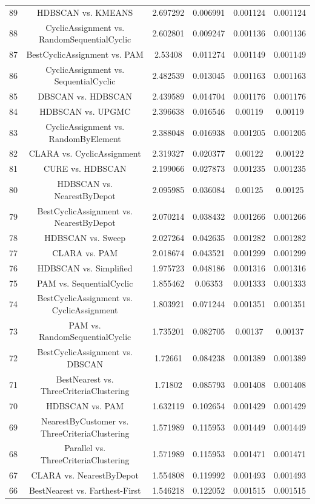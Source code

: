 \documentclass[a4paper,10pt]{article}
\begin{document}
\begin{landscape}
\begin{table}[!htp]
\begin{tabular}{cccccc}
89&HDBSCAN vs. KMEANS&2.697292&0.006991&0.001124&0.001124\\
88&CyclicAssignment vs. RandomSequentialCyclic&2.602801&0.009247&0.001136&0.001136\\
87&BestCyclicAssignment vs. PAM&2.53408&0.011274&0.001149&0.001149\\
86&CyclicAssignment vs. SequentialCyclic&2.482539&0.013045&0.001163&0.001163\\
85&DBSCAN vs. HDBSCAN&2.439589&0.014704&0.001176&0.001176\\
84&HDBSCAN vs. UPGMC&2.396638&0.016546&0.00119&0.00119\\
83&CyclicAssignment vs. RandomByElement&2.388048&0.016938&0.001205&0.001205\\
82&CLARA vs. CyclicAssignment&2.319327&0.020377&0.00122&0.00122\\
81&CURE vs. HDBSCAN&2.199066&0.027873&0.001235&0.001235\\
80&HDBSCAN vs. NearestByDepot&2.095985&0.036084&0.00125&0.00125\\
79&BestCyclicAssignment vs. NearestByDepot&2.070214&0.038432&0.001266&0.001266\\
78&HDBSCAN vs. Sweep&2.027264&0.042635&0.001282&0.001282\\
77&CLARA vs. PAM&2.018674&0.043521&0.001299&0.001299\\
76&HDBSCAN vs. Simplified&1.975723&0.048186&0.001316&0.001316\\
75&PAM vs. SequentialCyclic&1.855462&0.06353&0.001333&0.001333\\
74&BestCyclicAssignment vs. CyclicAssignment&1.803921&0.071244&0.001351&0.001351\\
73&PAM vs. RandomSequentialCyclic&1.735201&0.082705&0.00137&0.00137\\
72&BestCyclicAssignment vs. DBSCAN&1.72661&0.084238&0.001389&0.001389\\
71&BestNearest vs. ThreeCriteriaClustering&1.71802&0.085793&0.001408&0.001408\\
70&HDBSCAN vs. PAM&1.632119&0.102654&0.001429&0.001429\\
69&NearestByCustomer vs. ThreeCriteriaClustering&1.571989&0.115953&0.001449&0.001449\\
68&Parallel vs. ThreeCriteriaClustering&1.571989&0.115953&0.001471&0.001471\\
67&CLARA vs. NearestByDepot&1.554808&0.119992&0.001493&0.001493\\
66&BestNearest vs. Farthest-First&1.546218&0.122052&0.001515&0.001515\\

\end{tabular}
\end{table}
\end{landscape}
\end{document}
